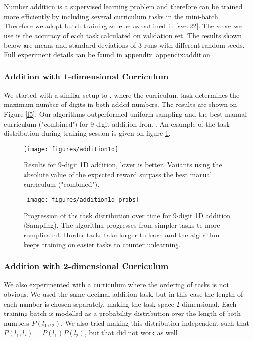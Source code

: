 \documentclass{article}
\begin{document}
Number addition is a supervised learning problem and therefore can be trained more efficiently by including several curriculum tasks in the mini-batch. Therefore we adopt batch training scheme as outlined in \ref{ssec22}. The score we use is the accuracy of each task calculated on validation set. The results shown below are means and standard deviations of 3 runs with different random seeds. Full experiment details can be found in appendix \ref{appendix:addition}.


\subsubsection{Addition with 1-dimensional Curriculum}

We started with a similar setup to \citep{Zaremba2014}, where the curriculum task determines the maximum number of digits in both added numbers. The results are shown on Figure \ref{f5}. Our algorithms outperformed uniform sampling and the best manual curriculum ("combined") for 9-digit addition from \citep{Zaremba2014}. An example of the task distribution during training session is given on figure \ref{f6}.

\begin{figure}[h]
\begin{minipage}[b]{65mm}
  \texttt{[image: figures/addition1d]}
\caption{Results for 9-digit 1D addition, lower is better. Variants using the absolute value of the expected reward surpass the best manual curriculum ("combined").}
\label{f5}
\end{minipage}
\hfill
\begin{minipage}[b]{65mm}
  \texttt{[image: figures/addition1d\_probs]}
\caption{Progression of the task distribution over time for 9-digit 1D addition (Sampling). The algorithm progresses from simpler tasks to more complicated. Harder tasks take longer to learn and the algorithm keeps training on easier tasks to counter unlearning.}
\label{f6}
\end{minipage}
\end{figure}

\subsubsection{Addition with 2-dimensional Curriculum}

We also experimented with a curriculum where the ordering of tasks is not obvious. We used the same decimal addition task, but in this case the length of each number is chosen separately, making the task-space 2-dimensional. Each training batch is modelled as a probability distribution over the length of both numbers $P(l_1, l_2)$. We also tried making this distribution independent such that $P(l_1, l_2) = P(l_1) P(l_2)$, but that did not work as well.
\end{document}
